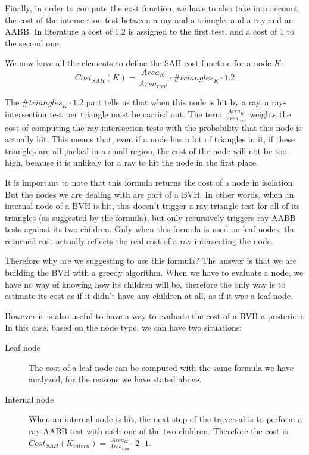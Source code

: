 \documentclass{PoliMi_MasterThesis}
\begin{document}
Finally, in order to compute the cost function, we have to also take into account the cost of the intersection test between a ray and a triangle, and a ray and an AABB. In literature a cost of $1.2$ is assigned to the first test, and a cost of $1$ to the second one.

We now have all the elements to define the SAH cost function for a node $K$:
$$Cost_{SAH}(K) = \frac{Area_K}{Area_{root}} \cdot \#triangles_K \cdot 1.2$$

The $\#triangles_K \cdot 1.2$ part tells us that when this node is hit by a ray, a ray-intersection test per triangle must be carried out. The term $\frac{Area_K}{Area_{root}}$ weights the cost of computing the ray-intersection tests with the probability that this node is actually hit. This means that, even if a node has a lot of triangles in it, if these triangles are all packed in a small region, the cost of the node will not be too high, because it is unlikely for a ray to hit the node in the first place.

It is important to note that this formula returns the cost of a node in isolation. But the nodes we are dealing with are part of a BVH. In other words, when an internal node of a BVH is hit, this doesn't trigger a ray-triangle test for all of its triangles (as suggested by the formula), but only recursively triggers ray-AABB tests against its two children. Only when this formula is used on leaf nodes, the returned cost actually reflects the real cost of a ray intersecting the node.

Therefore why are we suggesting to use this formula? The answer is that we are building the BVH with a greedy algorithm. When we have to evaluate a node, we have no way of knowing how its children will be, therefore the only way is to estimate its cost as if it didn't have any children at all, as if it was a leaf node.

However it is also useful to have a way to evaluate the cost of a BVH a-posteriori. In this case, based on the node type, we can have two situations:
\begin{description}
	\item[Leaf node] The cost of a leaf node can be computed with the same formula we have analyzed, for the reasons we have stated above.
	\item[Internal node] When an internal node is hit, the next step of the traversal is to perform a ray-AABB test with each one of the two children. Therefore the cost is: $Cost_{SAH}(K_{intern}) = \frac{Area_K}{Area_{root}} \cdot 2 \cdot 1$. 
\end{description}
\end{document}
